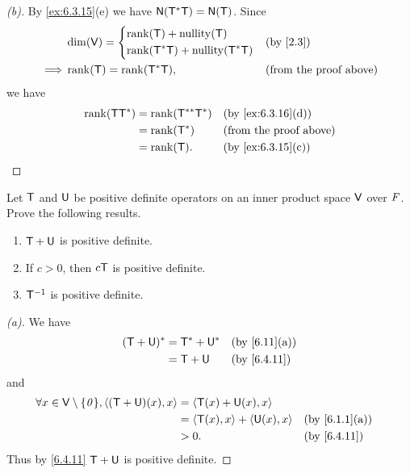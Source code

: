\begin{proof}[(b)]
  By \cref{ex:6.3.15}(e) we have \(\ns{\T^* \T} = \ns{\T}\).
  Since
  \begin{align*}
             & \dim(\V) = \begin{dcases}
                            \rk{\T} + \nt{\T} \\
                            \rk{\T^* \T} + \nt{\T^* \T}
                          \end{dcases} &  & \by{2.3}                          \\
    \implies & \rk{\T} = \rk{\T^* \T},     &  & \text{(from the proof above)}
  \end{align*}
  we have
  \begin{align*}
    \rk{\T \T^*} & = \rk{\T^{**} \T^*} &  & \by{ex:6.3.16}[d]             \\
                 & = \rk{\T^*}         &  & \text{(from the proof above)} \\
                 & = \rk{\T}.          &  & \by{ex:6.3.15}[c]
  \end{align*}
\end{proof}

\begin{ex}\label{ex:6.4.19}
  Let \(\mathsf{T}\) and \(\mathsf{U}\) be positive definite operators on an inner product space \(\mathsf{V}\) over \(\mathit{F}\).
  Prove the following results.
  \begin{enumerate}
    \item \(\mathsf{T} + \mathsf{U}\) is positive definite.
    \item If \(c > 0\), then \(c \mathsf{T}\) is positive definite.
    \item \(\mathsf{T}^{-1}\) is positive definite.
  \end{enumerate}
\end{ex}

\begin{proof}[(a)]
  We have
  \begin{align*}
    (\T + \U)^* & = \T^* + \U^* &  & \by{6.11}[a] \\
                & = \T + \U     &  & \by{6.4.11}
  \end{align*}
  and
  \begin{align*}
    \forall x \in \V \setminus \set{\zv}, \inn{(\T + \U)(x), x} & = \inn{\T(x) + \U(x), x}                             \\
                                                                & = \inn{\T(x), x} + \inn{\U(x), x} &  & \by{6.1.1}[a] \\
                                                                & > 0.                              &  & \by{6.4.11}
  \end{align*}
  Thus by \cref{6.4.11} \(\mathsf{T} + \mathsf{U}\) is positive definite.
\end{proof}


